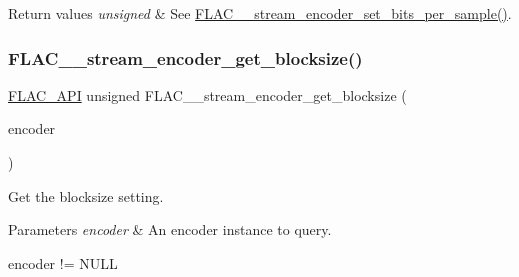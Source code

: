 \begin{DoxyRetVals}{Return values}
{\em unsigned} & See \hyperlink{group__flac__stream__encoder_ga5a21cf7f86a81df6ba72714a6b917aa3}{F\+L\+A\+C\+\_\+\+\_\+stream\+\_\+encoder\+\_\+set\+\_\+bits\+\_\+per\+\_\+sample()}. \\
\hline
\end{DoxyRetVals}
\mbox{\label{group__flac__stream__encoder_ga75bbef3f55b0e1e18642dd0091ad393e}} 
\subsubsection{\texorpdfstring{F\+L\+A\+C\+\_\+\+\_\+stream\+\_\+encoder\+\_\+get\+\_\+blocksize()}{FLAC\_\_stream\_encoder\_get\_blocksize()}}
{\footnotesize\ttfamily \hyperlink{group__flac__export_ga56ca07df8a23310707732b1c0007d6f5}{F\+L\+A\+C\+\_\+\+A\+PI} unsigned F\+L\+A\+C\+\_\+\+\_\+stream\+\_\+encoder\+\_\+get\+\_\+blocksize (\begin{DoxyParamCaption}\item[{\hyperlink{zconf_8h_a2c212835823e3c54a8ab6d95c652660e}{const} \hyperlink{struct_f_l_a_c_____stream_encoder}{F\+L\+A\+C\+\_\+\+\_\+\+Stream\+Encoder} $\ast$}]{encoder }\end{DoxyParamCaption})}

Get the blocksize setting.


\begin{DoxyParams}{Parameters}
{\em encoder} & An encoder instance to query.  
\begin{DoxyCode}
encoder != NULL 
\end{DoxyCode}
 \\
\hline
\end{DoxyParams}

